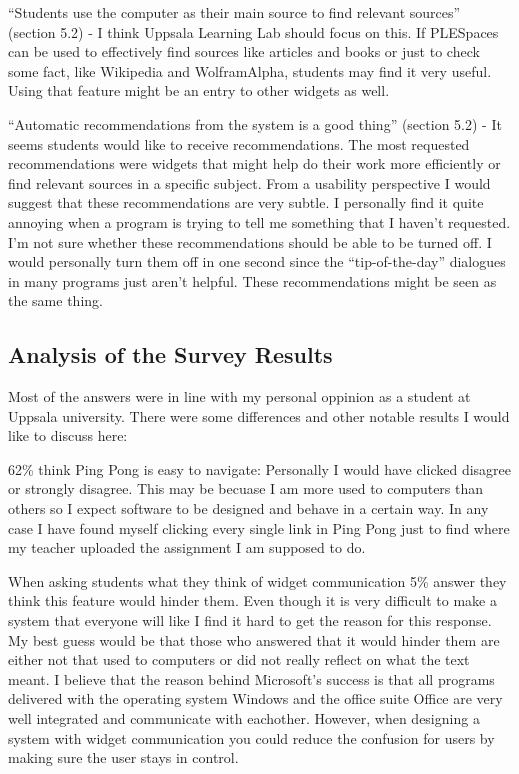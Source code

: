 “Students use the computer as their main source to find relevant sources” (section 5.2) - I think Uppsala Learning Lab should focus on this. If PLESpaces can be used to effectively find sources like articles and books or just to check some fact, like Wikipedia and WolframAlpha, students may find it very useful. Using that feature might be an entry to other widgets as well.

“Automatic recommendations from the system is a good thing” (section 5.2) - It seems students would like to receive recommendations. The most requested recommendations were widgets that might help do their work more efficiently or find relevant sources in a specific subject. From a usability perspective I would suggest that these recommendations are very subtle. I personally find it quite annoying when a program is trying to tell me something that I haven't requested. I'm not sure whether these recommendations should be able to be turned off. I would personally turn them off in one second since the “tip-of-the-day” dialogues in many programs just aren't helpful. These recommendations might be seen as the same thing.

\subsection {Analysis of the Survey Results}
Most of the answers were in line with my personal oppinion as a student at Uppsala university. There were some differences and other notable results I would like to discuss here:

62\% think Ping Pong is easy to navigate: Personally I would have clicked disagree or strongly disagree. This may be becuase I am more used to computers than others so I expect software to be designed and  behave in a certain way. In any case I have found myself clicking every single link in Ping Pong just to find where my teacher uploaded the assignment I am supposed to do.

When asking students what they think of widget communication 5\% answer they think this feature would hinder them. Even though it is very difficult to make a system that everyone will like I find it hard to get the reason for this response. My best guess would be that those who answered that it would hinder them are either not that used to computers or did not really reflect on what the text meant. I believe that the reason behind Microsoft's success is that all programs delivered with the operating system Windows and the office suite Office are very well integrated and communicate with eachother. However, when designing a system with widget communication you could reduce the confusion for users by making sure the user stays in control.


